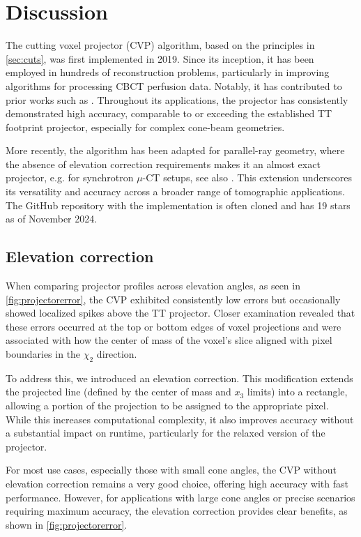 \section{Discussion}

The cutting voxel projector (CVP) algorithm, based on the principles in \cref{sec:cuts}, was first implemented in 2019. Since its inception, it has been employed in hundreds of reconstruction problems, particularly in improving algorithms for processing CBCT perfusion data. Notably, it has contributed to prior works such as \cite{Kulvait2021, Haseljic2021, Kulvait2022}. Throughout its applications, the projector has consistently demonstrated high accuracy, comparable to or exceeding the established TT footprint projector, especially for complex cone-beam geometries. 

More recently, the algorithm has been adapted for parallel-ray geometry, where the absence of elevation correction requirements makes it an almost exact projector, e.g. for synchrotron $\mu$-CT setups, see also \cite{Moosmann2014}. This extension underscores its versatility and accuracy across a broader range of tomographic applications. The GitHub repository with the implementation is often cloned and has 19 stars as of November 2024.

\subsection{Elevation correction}
When comparing projector profiles across elevation angles, as seen in \cref{fig:projectorerror}, the CVP exhibited consistently low errors but occasionally showed localized spikes above the TT projector. Closer examination revealed that these errors occurred at the top or bottom edges of voxel projections and were associated with how the center of mass of the voxel's slice aligned with pixel boundaries in the $\chi_2$ direction.

To address this, we introduced an elevation correction. This modification extends the projected line (defined by the center of mass and $x_3$ limits) into a rectangle, allowing a portion of the projection to be assigned to the appropriate pixel. While this increases computational complexity, it also improves accuracy without a substantial impact on runtime, particularly for the relaxed version of the projector.

For most use cases, especially those with small cone angles, the CVP without elevation correction remains a very good choice, offering high accuracy with fast performance. However, for applications with large cone angles or precise scenarios requiring maximum accuracy, the elevation correction provides clear benefits, as shown in \cref{fig:projectorerror}.

